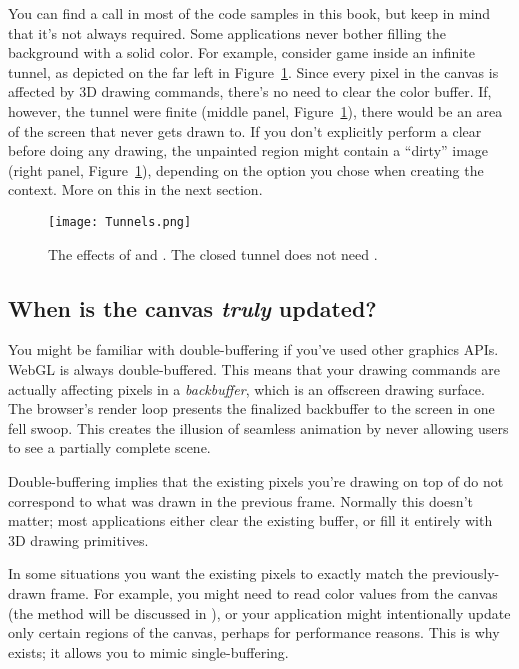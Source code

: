 You can find a  call in most of the code samples in this book, but keep in mind that it's not always required.  Some applications never bother filling the background with a solid color.  For example, consider game inside an infinite tunnel, as depicted on the far left in Figure~\ref{fig:Tunnel}.  Since every pixel in the canvas is affected by 3D drawing commands, there's no need to clear the color buffer.  If, however, the tunnel were finite (middle panel, Figure~\ref{fig:Tunnel}), there would be an area of the screen that never gets drawn to.  If you don't explicitly perform a clear before doing any drawing, the unpainted region might contain a ``dirty'' image (right panel, Figure~\ref{fig:Tunnel}), depending on the  option you chose when creating the context.  More on this in the next section.

\begin{figure}[htb]\centering
  \texttt{[image: Tunnels.png]}
  \caption{The effects of  and .  The closed tunnel does not need .}
  \label{fig:Tunnel}
\end{figure}

\subsection{When is the canvas \emph{truly} updated?}
\label{sec:doublebuffer}

You might be familiar with  double-buffering if you've used other graphics APIs.  WebGL is always double-buffered.  This means that your drawing commands are actually affecting pixels in a  \emph{backbuffer}, which is an offscreen drawing surface.  The browser's render loop presents the finalized backbuffer to the screen in one fell swoop.  This creates the illusion of seamless animation by never allowing users to see a partially complete scene.

Double-buffering implies that the existing pixels you're drawing on top of do not correspond to what was drawn in the previous frame.  Normally this doesn't matter; most applications either clear the existing buffer, or fill it entirely with 3D drawing primitives.

In some situations you want the existing pixels to exactly match the previously-drawn frame.  For example, you might need to read color values from the canvas (the   method will be discussed in ), or your application might intentionally update only certain regions of the canvas, perhaps for performance reasons.  This is why  exists; it allows you to mimic  single-buffering.

